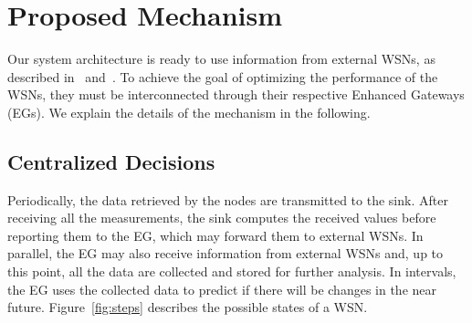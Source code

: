 \documentclass{llncs}
\newcommand{\EG}[1]{EG}
\begin{document}
\begin{comment}
\subsection{Increasing the WSNs' lifetime}

Randomly turning off nodes to save energy is a naive solution that may result 
in missing relevant information about the environment. Instead, the system must 
measure how relevant the data provided by each node is, and use that information 
to choose the nodes that will be turned off to operate the WSN correctly when 
saving energy. This involves attending minimal requirements, such as covering 
certain areas and having a minimum number of measurements per area. Besides 
measuring and keeping the quality of the measurements, updates in the WSN 
operation must be applied at the right time in order to optimally react to the 
predicted situations.

Differently from the other challenges, this one also exists in the 
intra-network collaboration (described in Section~\ref{sec:related-work}), and 
existing solutions there may help to solve this issue.
\end{comment}



\section{Proposed Mechanism}
\label{sec:simulations}

Our system architecture is ready to use information from external WSNs, as 
described in~\cite{Pal2012} and~\cite{OechsnerVisions2014}.
To achieve the goal of optimizing the performance of the WSNs, they must be 
interconnected through their respective Enhanced Gateways (EGs). 
We explain the details of the mechanism in the following.





\subsection{Centralized Decisions}
\label{section:predictions}

Periodically, the data retrieved by the nodes are transmitted to the sink. 
After receiving all the measurements, the sink computes
the received values before reporting them to the \EG{}, which may forward them 
to external WSNs. In parallel, the \EG{} may also receive information from 
external WSNs and, up to this point, all the data are collected and stored for 
further analysis. In intervals, the \EG{} uses the collected data to predict if 
there will be changes in the near future. Figure~\ref{fig:steps} describes the 
possible states of a WSN. 
\end{document}

